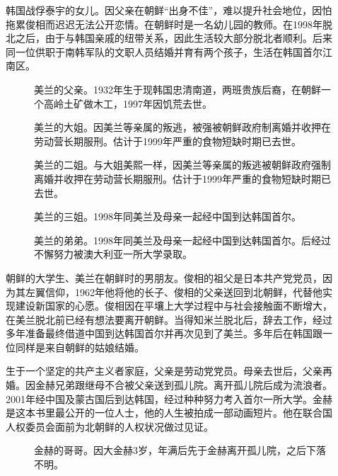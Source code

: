 \begin{multicols}{\theparacolNo}
\begin{description}
	\item[] 韩国战俘泰宇的女儿。因父亲在朝鲜“出身不佳”，难以提升社会地位，因怕拖累俊相而迟迟无法公开恋情。在朝鲜时是一名幼儿园的教师。在1998年脱北之后，由于与韩国亲戚的纽带关系，因此生活较大部分脱北者顺利。后来同一位供职于南韩军队的文职人员结婚并育有两个孩子，生活在韩国首尔江南区。
		{\footnotesize \begin{description}
				\item[] 美兰的父亲。1932年生于现韩国忠清南道，两班贵族后裔，在朝鲜一个高岭土矿做木工，1997年因饥荒去世。
				\item[] 美兰的大姐。因美兰等亲属的叛逃，被强被朝鲜政府制离婚并收押在劳动营长期服刑。估计于1999年严重的食物短缺时期已去世。
				\item[] 美兰的二姐。与大姐美熙一样，因美兰等亲属的叛逃被朝鲜政府强制离婚并收押在劳动营长期服刑。估计于1999年严重的食物短缺时期已去世。
				\item[] 美兰的三姐。1998年同美兰及母亲一起经中国到达韩国首尔。
				\item[] 美兰的弟弟。1998年同美兰及母亲一起经中国到达韩国首尔。后经过不懈努力被澳大利亚一所大学录取。
		\end{description}}
	
	\item[] 朝鲜的大学生、美兰在朝鲜时的男朋友。俊相的祖父是日本共产党党员，因为其左翼信仰，1962年他将他的长子、俊相的父亲送回到北朝鲜，代替他实现建设新国家的心愿。俊相因在平壤上大学过程中与社会接触面不断增大，在美兰脱北前已经有想法要离开朝鲜。当得知米兰脱北后，辞去工作，经过多年准备最终借道中国到达韩国首尔并再次见到了美兰。多年后在韩国跟一位同样是来自朝鲜的姑娘结婚。\\
	
	\item[] 生于一个坚定的共产主义者家庭，父亲是劳动党党员。母亲去世后，父亲再婚。因金赫兄弟跟继母不合被父亲送到孤儿院。离开孤儿院后成为流浪者。2001年经中国及蒙古国后到达韩国，经过种种努力考入首尔一所大学。金赫是这本书里最公开的一位人士，他的人生被拍成一部动画短片。他在联合国人权委员会面前为北朝鲜的人权状况做过见证。
		{\footnotesize \begin{description}
			\item[] 金赫的哥哥。因大金赫3岁，年满后先于金赫离开孤儿院，之后下落不明。
		\end{description}}
	

\end{description}
\end{multicols}
